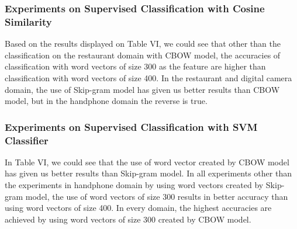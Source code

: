 \documentclass[a4paper,conference]{IEEEtran}
\begin{document}
\subsubsection{Experiments on Supervised Classification with Cosine Similarity}
Based on the results displayed on Table VI, we could see that other than the classification on the restaurant domain with CBOW model, the accuracies of classification with word vectors of size 300 as the feature are higher than classification with word vectors of size 400. In the restaurant and digital camera domain, the use of Skip-gram model has given us better results than CBOW model, but in the handphone domain the reverse is true. 

\subsubsection{Experiments on Supervised Classification with SVM Classifier}
In Table VI, we could see that the use of word vector created by CBOW model has given us better results than Skip-gram model. In all experiments other than the experiments in handphone domain by using word vectors created by Skip-gram model, the use of word vectors of size 300 results in better accuracy than using word vectors of size 400. In every domain, the highest accuracies are achieved by using word vectors of size 300 created by CBOW model.
\end{document}

